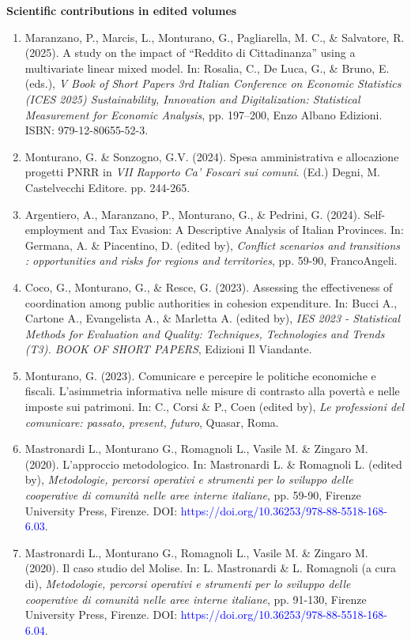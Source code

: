 \documentclass[11pt,a4paper,sans]{moderncv} %
\begin{document}
\textbf{Scientific contributions in edited volumes}
\begin{enumerate}[label=\arabic*.]


\item Maranzano, P., Marcis, L., Monturano, G., Pagliarella, M. C., \& Salvatore, R. (2025). A study on the impact of “Reddito di Cittadinanza” using a multivariate linear mixed model. In: Rosalia, C., De Luca, G., \& Bruno, E. (eds.), \textit{V Book of Short Papers 3rd Italian Conference on Economic Statistics (ICES 2025) Sustainability, Innovation and Digitalization: Statistical Measurement for Economic Analysis}, pp. 197--200, Enzo Albano Edizioni. ISBN: 979-12-80655-52-3.



    \item Monturano, G. \& Sonzogno, G.V. (2024). Spesa amministrativa e allocazione progetti PNRR in \textit{VII Rapporto Ca’ Foscari sui comuni}. (Ed.) Degni, M. Castelvecchi Editore. pp. 244-265.

    
    \item Argentiero, A., Maranzano, P., Monturano, G., \& Pedrini, G. (2024). Self-employment and Tax Evasion: A Descriptive Analysis of Italian Provinces. In: Germana, A. \& Piacentino, D. (edited by), \textit{Conflict scenarios and transitions : opportunities and risks for regions and territories}, pp. 59-90, FrancoAngeli.
    
    \item Coco, G., Monturano, G., \& Resce, G. (2023). Assessing the effectiveness of coordination among public authorities in cohesion expenditure. In: Bucci A., Cartone A., Evangelista A., \& Marletta A. (edited by), \textit{IES 2023 - Statistical Methods for Evaluation and Quality: Techniques, Technologies and Trends (T3). BOOK OF SHORT PAPERS}, Edizioni Il Viandante.
    
    \item Monturano, G. (2023). Comunicare e percepire le politiche economiche e fiscali. L’asimmetria informativa nelle misure di contrasto alla povertà e nelle imposte sui patrimoni. In: C., Corsi \& P., Coen (edited by), \textit{Le professioni del comunicare: passato, present, futuro}, Quasar, Roma.
    
    \item Mastronardi L., Monturano G., Romagnoli L., Vasile M. \& Zingaro M. (2020). L'approccio metodologico. In: Mastronardi L. \& Romagnoli L. (edited by), \textit{Metodologie, percorsi operativi e strumenti per lo sviluppo delle cooperative di comunità nelle aree interne italiane}, pp. 59-90, Firenze University Press, Firenze. DOI: \textcolor{blue}{https://doi.org/10.36253/978-88-5518-168-6.03}.
    
    \item Mastronardi L., Monturano G., Romagnoli L., Vasile M. \& Zingaro M. (2020). Il caso studio del Molise. In: L. Mastronardi \& L. Romagnoli (a cura di), \textit{Metodologie, percorsi operativi e strumenti per lo sviluppo delle cooperative di comunità nelle aree interne italiane}, pp. 91-130, Firenze University Press, Firenze. DOI: \textcolor{blue}{https://doi.org/10.36253/978-88-5518-168-6.04}.
\end{enumerate}
\end{document}
